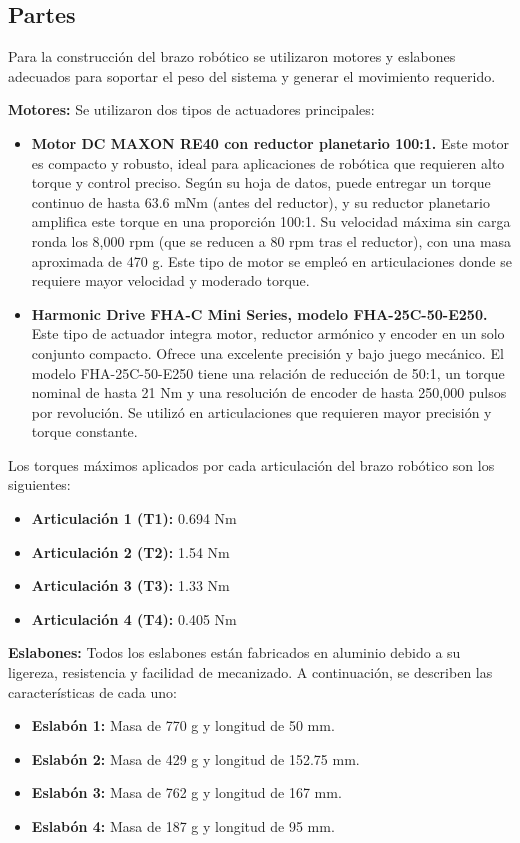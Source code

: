 \subsection{Partes} \label{subsec:partes} 

Para la construcción del brazo robótico se utilizaron motores y eslabones adecuados para soportar el peso del sistema y generar el movimiento requerido.

\textbf{Motores:} Se utilizaron dos tipos de actuadores principales:

\begin{itemize}
	\item \textbf{Motor DC MAXON RE40 con reductor planetario 100:1.} Este motor es compacto y robusto, ideal para aplicaciones de robótica que requieren alto torque y control preciso. Según su hoja de datos, puede entregar un torque continuo de hasta 63.6 mNm (antes del reductor), y su reductor planetario amplifica este torque en una proporción 100:1. Su velocidad máxima sin carga ronda los 8,000 rpm (que se reducen a 80 rpm tras el reductor), con una masa aproximada de 470 g. Este tipo de motor se empleó en articulaciones donde se requiere mayor velocidad y moderado torque.
	
	\item \textbf{Harmonic Drive FHA-C Mini Series, modelo FHA-25C-50-E250.} Este tipo de actuador integra motor, reductor armónico y encoder en un solo conjunto compacto. Ofrece una excelente precisión y bajo juego mecánico. El modelo FHA-25C-50-E250 tiene una relación de reducción de 50:1, un torque nominal de hasta 21 Nm y una resolución de encoder de hasta 250,000 pulsos por revolución. Se utilizó en articulaciones que requieren mayor precisión y torque constante.
\end{itemize}

Los torques máximos aplicados por cada articulación del brazo robótico son los siguientes:

\begin{itemize}
	\item \textbf{Articulación 1 (T1):} 0.694 Nm
	\item \textbf{Articulación 2 (T2):} 1.54 Nm
	\item \textbf{Articulación 3 (T3):} 1.33 Nm
	\item \textbf{Articulación 4 (T4):} 0.405 Nm
\end{itemize}

\textbf{Eslabones:} Todos los eslabones están fabricados en aluminio debido a su ligereza, resistencia y facilidad de mecanizado. A continuación, se describen las características de cada uno:

\begin{itemize}
	\item \textbf{Eslabón 1:} Masa de 770 g y longitud de 50 mm.
	\item \textbf{Eslabón 2:} Masa de 429 g y longitud de 152.75 mm.
	\item \textbf{Eslabón 3:} Masa de 762 g y longitud de 167 mm.
	\item \textbf{Eslabón 4:} Masa de 187 g y longitud de 95 mm.
\end{itemize}


